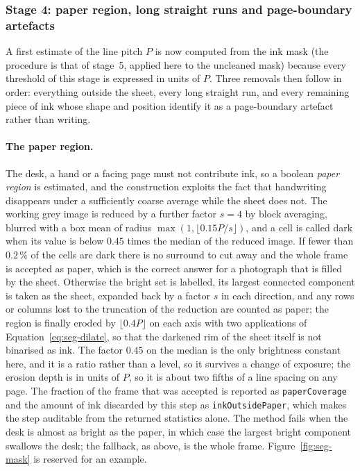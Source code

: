 \subsubsection{Stage 4: paper region, long straight runs and page-boundary artefacts}

A first estimate of the line pitch $P$ is now computed from the ink mask (the procedure is that of stage~5, applied here to the uncleaned mask) because every threshold of this stage is expressed in units of $P$.
Three removals then follow in order: everything outside the sheet, every long straight run, and every remaining piece of ink whose shape and position identify it as a page-boundary artefact rather than writing.

\paragraph{The paper region.}
The desk, a hand or a facing page must not contribute ink, so a boolean \emph{paper region} is estimated, and the construction exploits the fact that handwriting disappears under a sufficiently coarse average while the sheet does not.
The working grey image is reduced by a further factor $s=4$ by block averaging, blurred with a box mean of radius $\max(1,\lfloor0.15P/s\rfloor)$, and a cell is called dark when its value is below $0.45$ times the median of the reduced image.
If fewer than $0.2\,\%$ of the cells are dark there is no surround to cut away and the whole frame is accepted as paper, which is the correct answer for a photograph that is filled by the sheet.
Otherwise the bright set is labelled, its largest connected component is taken as the sheet, expanded back by a factor $s$ in each direction, and any rows or columns lost to the truncation of the reduction are counted as paper; the region is finally eroded by $\lfloor0.4P\rfloor$ on each axis with two applications of Equation~\ref{eq:seg-dilate}, so that the darkened rim of the sheet itself is not binarised as ink.
The factor $0.45$ on the median is the only brightness constant here, and it is a ratio rather than a level, so it survives a change of exposure; the erosion depth is in units of $P$, so it is about two fifths of a line spacing on any page.
The fraction of the frame that was accepted is reported as \texttt{paperCoverage} and the amount of ink discarded by this step as \texttt{inkOutsidePaper}, which makes the step auditable from the returned statistics alone.
The method fails when the desk is almost as bright as the paper, in which case the largest bright component swallows the desk; the fallback, as above, is the whole frame.
Figure~\ref{fig:seg-mask} is reserved for an example.

